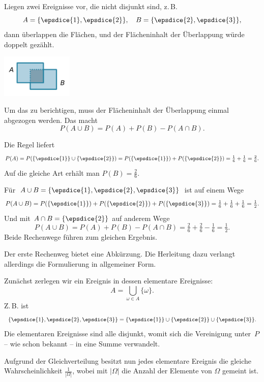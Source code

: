 \documentclass[9pt]{beamer}
\newcommand{\parspace}{\vspace{0.8em}}
\newcommand\dice[1]{\vcenter{\hbox{\epsdice{#1}}}}
\begin{document}
\begin{frame}
Liegen zwei Ereignisse vor, die nicht disjunkt sind, z.\,B.
\[A=\{\dice{1},\dice{2}\},\quad B=\{\dice{2},\dice{3}\},\]
dann überlappen die Flächen, und der Flächeninhalt
der Überlappung würde doppelt gezählt.\pause

\vspace{-1em}
\begin{center}
\includegraphics[width=34mm]{img/intersection.pdf}
\end{center}\pause

\vspace{-1em}
Um das zu berichtigen, muss der Flächeninhalt der Überlappung
einmal abgezogen werden.\pause{} Das macht
\[P(A\cup B) = P(A) + P(B) - P(A\cap B).\]
\end{frame}

\begin{frame}
Die Regel liefert
\[P(A) = P(\{\dice{1}\}\cup\{\dice{2}\})
= P(\{\dice{1}\})+P(\{\dice{2}\}) = \tfrac{1}{6}+\tfrac{1}{6}
= \tfrac{2}{6}.\]\pause
Auf die gleiche Art erhält man $P(B)=\tfrac{2}{6}$.\pause

\vspace{0.8em}
Für $A\cup B = \{\dice{1},\dice{2},\dice{3}\}$ ist auf einem Wege
\[P(A\cup B) = P(\{\dice{1}\}) + P(\{\dice{2}\}) + P(\{\dice{3}\})
= \tfrac{1}{6}+\tfrac{1}{6}+\tfrac{1}{6} = \tfrac{1}{2}.\]\pause
Und mit $A\cap B = \{\dice{2}\}$ auf anderem Wege
\[P(A\cup B) = P(A) + P(B) - P(A\cap B)
= \tfrac{2}{6}+\tfrac{2}{6} - \tfrac{1}{6} = \tfrac{1}{2}.\]\pause
Beide Rechenwege führen zum gleichen Ergebnis.
\end{frame}

\begin{frame}
Der erste Rechenweg bietet eine Abkürzung. Die Herleitung dazu
verlangt allerdings die Formulierung in allgemeiner Form.\pause

\parspace
Zunächst zerlegen wir ein Ereignis in dessen elementare
Ereignisse:
\[A = \bigcup_{\omega\in A} \{\omega\}.\]
Z.\,B. ist
\[\{\dice{1},\dice{2},\dice{3}\}
= \{\dice{1}\}\cup\{\dice{2}\}\cup\{\dice{3}\}.
\]\pause
Die elementaren Ereignisse sind alle disjunkt, womit sich die
Vereinigung unter~$P$ -- wie schon bekannt --
in eine Summe verwandelt.\pause

\parspace
Aufgrund der Gleichverteilung besitzt nun jedes elementare Ereignis
die gleiche Wahrscheinlichkeit $\tfrac{1}{|\Omega|}$, wobei mit
$|\Omega|$ die Anzahl der Elemente von $\Omega$ gemeint ist.
\end{frame}
\end{document}
